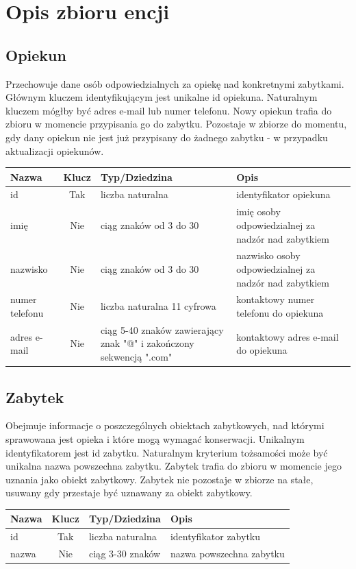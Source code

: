 \documentclass{article}
\begin{document}
\section{Opis zbioru encji}
\centering
\subsection*{Opiekun}
Przechowuje dane osób odpowiedzialnych za opiekę nad konkretnymi zabytkami. Głównym kluczem identyfikującym jest unikalne id opiekuna. Naturalnym kluczem mógłby być adres e-mail lub numer telefonu. Nowy opiekun trafia do zbioru w momencie przypisania go do zabytku. Pozostaje w zbiorze do momentu, gdy dany opiekun nie jest już przypisany do żadnego zabytku - w przypadku aktualizacji opiekunów.  
\begin{longtable}{|C{3cm}|c|C{4.5cm}|C{5cm}|}
\hline
\textbf{Nazwa} & \textbf{Klucz} & \textbf{Typ/Dziedzina} & \textbf{Opis} \\ \hline
id & Tak & liczba naturalna & identyfikator opiekuna \\ \hline 
imię & Nie & ciąg znaków od 3 do 30 & imię osoby odpowiedzialnej za nadzór nad zabytkiem \\ \hline 
nazwisko & Nie & ciąg znaków od 3 do 30 & nazwisko osoby odpowiedzialnej za nadzór nad zabytkiem \\ \hline 
numer telefonu & Nie & liczba naturalna 11 cyfrowa & kontaktowy numer telefonu do opiekuna \\ \hline
adres e-mail & Nie & ciąg 5-40 znaków zawierający znak "@" i zakończony sekwencją ".com" & kontaktowy adres e-mail do opiekuna \\ \hline
\end{longtable}

\subsection*{Zabytek}
Obejmuje informacje o poszczególnych obiektach zabytkowych, nad którymi sprawowana jest opieka i które mogą wymagać konserwacji. Unikalnym identyfikatorem jest id zabytku. Naturalnym kryterium tożsamości może być unikalna nazwa powszechna zabytku. Zabytek trafia do zbioru w momencie jego uznania jako obiekt zabytkowy. Zabytek nie pozostaje w zbiorze na stałe, usuwany gdy przestaje być uznawany za obiekt zabytkowy.  
\begin{longtable}{|C{3cm}|c|C{4.5cm}|C{5cm}|}
\hline
\textbf{Nazwa} & \textbf{Klucz} & \textbf{Typ/Dziedzina} & \textbf{Opis} \\ \hline
id & Tak & liczba naturalna & identyfikator zabytku \\ \hline
nazwa & Nie & ciąg 3-30 znaków & nazwa powszechna zabytku \\ \hline
\end{longtable}
\end{document}

